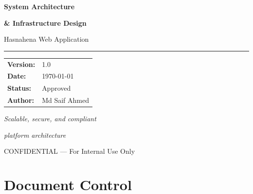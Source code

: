 \documentclass[11pt,a4paper]{article}
\newcommand{\DocumentSubtitle}{Hasnahena Web Application}
\newcommand{\DocumentVersion}{1.0}
\newcommand{\DocumentDate}{\today}
\begin{document}
\begin{titlepage}
    \centering
    \vspace*{2cm}
    
    {\Huge\bfseries\color{primaryblue}System Architecture\par}
    {\Huge\bfseries\color{primaryblue}\& Infrastructure Design\par}
    \vspace{0.5cm}
    {\LARGE\color{darkgray}\DocumentSubtitle\par}
    
    \vspace{1.5cm}
    
    {\color{primaryblue}\rule{10cm}{2pt}\par}
    
    \vspace{2cm}
    
    \begin{tabular}{ll}
        \textbf{Version:} & \DocumentVersion \\[0.5em]
        \textbf{Date:} & \DocumentDate \\[0.5em]
        \textbf{Status:} & Approved \\[0.5em]
        \textbf{Author:} & Md Saif Ahmed \\[0.5em]
    \end{tabular}
    
    \vfill
    
    {\large\color{darkgray}\textit{Scalable, secure, and compliant}\par}
    {\large\color{darkgray}\textit{platform architecture}\par}
    
    \vspace{1cm}
    
    {\footnotesize\color{darkgray}CONFIDENTIAL --- For Internal Use Only\par}
\end{titlepage}

\tableofcontents
\newpage

\section*{Document Control}
\end{document}
